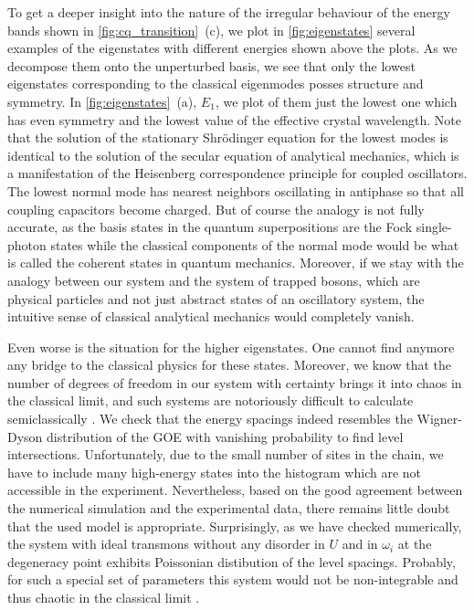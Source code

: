 \documentclass[%
 aps, pra,
 amsmath,amssymb,
 reprint,%
superscriptaddress
]{revtex4-2}
\begin{document}
To get a deeper insight into the nature of the irregular behaviour of the energy bands shown in \autoref{fig:cq_transition}~(c), we plot in \autoref{fig:eigenstates} several examples of the eigenstates with different energies shown above the plots. As we decompose them onto the unperturbed basis, we see that only the lowest eigenstates corresponding to the classical eigenmodes posses structure and symmetry. In \autoref{fig:eigenstates}~(a), $E_1$, we plot of them just the lowest one which has even symmetry and the lowest value of the effective crystal wavelength. Note that the solution of the stationary Shrödinger equation for the lowest modes is identical to the solution of the secular equation of analytical mechanics, which is a manifestation of the Heisenberg correspondence principle for coupled oscillators. The lowest normal mode has nearest neighbors oscillating in antiphase so that all coupling capacitors become charged. But of course the analogy is not fully accurate, as the basis states in the quantum superpositions are the Fock single-photon states while the classical components of the normal mode would be what is called the coherent states in quantum mechanics. Moreover, if we stay with the analogy between our system and the system of trapped bosons, which are physical particles and not just abstract states of an oscillatory system, the intuitive sense of classical analytical mechanics would completely vanish.

Even worse is the situation for the higher eigenstates. One cannot find anymore any bridge to the classical physics for these states. Moreover, we know that the number of degrees of freedom in our system with certainty brings it into chaos in the classical limit, and such systems are notoriously difficult to calculate semiclassically \cite{wintgen1992semiclassical}. We check that the energy spacings indeed resembles the Wigner-Dyson distribution of the GOE 
\cite{bohigas1984characterization, livan2018introduction} with vanishing probability to find level intersections. Unfortunately, due to the small number of sites in the chain, we have to include many high-energy states into the histogram which are not accessible in the experiment. Nevertheless, based on the good agreement between the numerical simulation and the experimental data, there remains little doubt that the used model is appropriate. Surprisingly, as we have checked numerically, the system with ideal transmons without any disorder in $U$ and in $\omega_i$ at the degeneracy point exhibits Poissonian distibution of the level spacings. Probably, for such a special set of parameters this system would not be non-integrable and thus chaotic in the classical limit \cite{kolovsky2004quantum,kim2014testing}.
\end{document}
